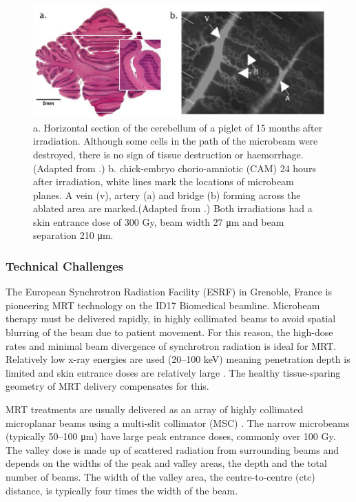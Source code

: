 	\begin{figure}
	\centering
	\includegraphics[width=\linewidth]{mrt_img/blattmann_mrt_hist}
	\caption{a. Horizontal section of the cerebellum of a piglet of 15 months after irradiation. Although some cells in the path of the microbeam were destroyed, there is no sign of tissue destruction or haemorrhage.  (Adapted from \cite{laissue2001weanling}.) b. chick-embryo chorio-amniotic (CAM) 24 hours after irradiation, white lines mark the locations of microbeam planes. A vein (v), artery (a) and bridge (b) forming across the ablated area are marked.(Adapted from \cite{blattmann2005applications}.) Both irradiations had a skin entrance dose of 300 Gy, beam width 27 \si{\um} and beam separation 210 \si{\um}.}
	\label{fig:blattmann_mrt_hist}
	\end{figure}
	

	
	\subsubsection{Technical Challenges}
	
	
	The European Synchrotron Radiation Facility (ESRF) in Grenoble, France is pioneering MRT technology on the ID17 Biomedical beamline. Microbeam therapy must be delivered rapidly, in highly collimated beams to avoid spatial blurring of the beam due to patient movement. For this reason, the high-dose rates and minimal beam divergence of synchrotron radiation is ideal for MRT. Relatively low x-ray energies are used (20--100 keV) meaning penetration depth is limited and skin entrance doses are relatively large \cite{blattmann2005applications}. The healthy tissue-sparing geometry of MRT delivery compensates for this.
	
	
	MRT treatments are usually delivered as an array of highly collimated microplanar beams using a multi-slit collimator (MSC) \cite{brauer2005characterization}. The narrow microbeams (typically 50--100 \si{\um}) have large peak entrance doses, commonly over 100 Gy.
	The valley dose is made up of scattered radiation from surrounding beams and depends on the widths of the peak and valley areas, the depth and the total number of beams. The width of the valley area, the centre-to-centre (ctc) distance, is typically four times the width of the beam. 
	
